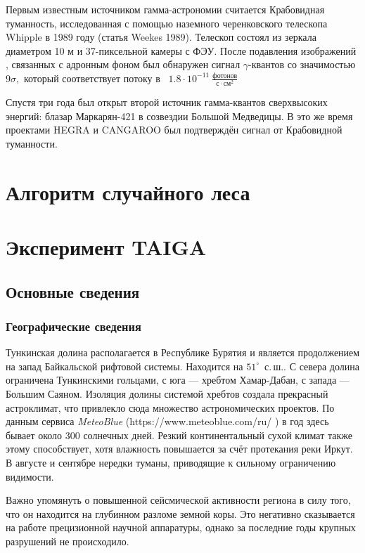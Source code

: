 \documentclass[magd,floatypics,numeref]{msudipl} %
\begin{document}
Первым известным источником гамма-астрономии считается Крабовидная туманность, исследованная с помощью наземного черенковского телескопа Whipple в 1989 году (статья Weekes 1989). Телескоп состоял из зеркала диаметром 10 м и 37-пиксельной камеры с  ФЭУ. После подавления изображений , связанных с адронным фоном был обнаружен сигнал $\gamma$-квантов со значимостью $9\sigma,$ который соответствует потоку в~ $1.8\cdot10^{-11}~\frac{\text{фотонов}}{\text{с}\cdot\text{см}^2}$

Спустя три года был открыт второй источник гамма-квантов сверхвысоких энергий: блазар Маркарян-421 в созвездии Большой Медведицы. В это же время проектами HEGRA и CANGAROO был подтверждён сигнал от Крабовидной туманности.


\chapter{Алгоритм случайного леса}
\chapter{Эксперимент TAIGA}
\section{Основные сведения}
\subsection{Географические сведения}
Тункинская долина располагается в Республике Бурятия и является продолжением на запад Байкальской рифтовой системы.  Находится на $51^{\circ}$~с.\,ш.. С севера долина ограничена Тункинскими гольцами, с юга --- хребтом Хамар-Дабан, с запада --- Большим Саяном. Изоляция долины системой хребтов создала прекрасный астроклимат, что привлекло сюда множество астрономических проектов. По данным сервиса \textit{MeteoBlue} (https://www.meteoblue.com/ru/%
)
в год здесь бывает около 300 солнечных дней. Резкий континентальный сухой климат также этому способствует, хотя влажность повышается за счёт протекания реки Иркут. В августе и сентябре нередки туманы, приводящие к сильному ограничению видимости. 

Важно упомянуть о повышенной сейсмической активности региона в силу того, что он находится на глубинном разломе земной коры. Это негативно сказывается на работе прецизионной научной аппаратуры, однако за последние годы крупных разрушений не происходило.
\end{document}
